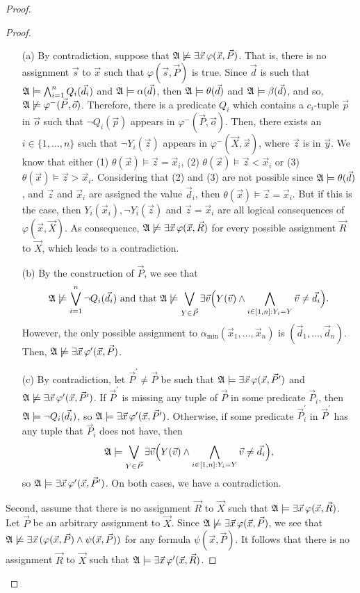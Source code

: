 \documentclass[12pt]{article}
\def\A{{\frak A}}
\def\P{\vec{P}}
\def\R{\vec{R}}
\def\X{\vec{X}}
\def\d{\vec{d}} %
\def\s{\vec{s}}
\def\v{\vec{v}} %
\def\x{\vec{x}} %
\def\y{\vec{y}} %
\def\z{\vec{z}} %
\def\ep{\vec{o}}
\def\ga{\vec{p}}
\begin{document}
\begin{proof}
\begin{enumerate}
\begin{proof}
\begin{enumerate}
\item[(a)] By contradiction, suppose that $\A\not\models\exists\x\,\varphi(\x,\P)$. That is, there is no assignment $\s$ to $\x$ such that $\varphi(\s,\P)$ is true. Since $\d$ is such that $\A\models \bigwedge_{i=1}^n Q_i(\d_i)$ and $\A\models \alpha(\d)$, then $\A\models\theta(\d)$ and $\A\models\beta(\d)$, and so, $\A\not\models\varphi^{-}(\P,\ep)$. Therefore, there is a predicate $Q_i$ which contains a $c_i$-tuple $\ga$ in $\ep$ such that $\neg Q_i(\ga)$ appears in $\varphi^{-}(\P,\ep)$. Then, there exists an $i\in\{1,\ldots,n\}$ such that $\neg Y_i(\z)$ appears in $\varphi^{-}(\X,\x)$, where $\z$ is in $\y$. We know that either (1) $\theta(\x)\models \z = \x_i$, (2) $\theta(\x)\models \z < \x_i$ or (3) $\theta(\x)\models \z > \x_i$. Considering that (2) and (3) are not possible since $\A\models\theta(\d)$, and $\z$ and $\x_i$ are assigned the value $\d_i$, then $\theta(\x)\models \z = \x_i$. But if this is the case, then $Y_i(\x_i), \neg Y_i(\z)$ and $\z = \x_i$ are all logical consequences of $\varphi(\x,\X).$ As consequence, $\A\not\models\exists\x\,\varphi(\x,\R)$ for every possible assignment $\R$ to $\X$, which leads to a contradiction.
\item[(b)] By the construction of $\P$, we see that 
$$\A\not\models\bigvee_{i = 1}^{n}\neg Q_i(\d_i) \text{ and that } \A\not\models\bigvee_{Y\in\P} \exists \v\Big( Y(\v) \wedge \bigwedge_{i\in[1,n]: Y_i = Y} \v \neq \d_i\Big).$$ However, the only possible assignment to $\alpha_{\min}(\x_1,\dots,\x_n)$ is $(\d_1,\dots,\d_n)$. Then, $\A\not\models\exists\x\,\varphi^\prime(\x,\P)$.
\item[(c)] By contradiction, let $\P^\prime \neq \P$ be such that $\A\models\exists\x\,\varphi(\x,\P^\prime)$ and $\A\not\models\exists\x\,\varphi^\prime(\x,\P^\prime)$. If $\P^\prime$ is missing any tuple of $\P$ in some predicate $\P_i$, then $\A\models \neg Q_i(\d_i)$, so $\A\models\exists\x\,\varphi^\prime(\x,\P^\prime)$. Otherwise, if some predicate $\P^\prime_i$ in $\P^\prime$ has any tuple that $\P_i$ does not have, then $$\A\models\bigvee_{Y\in\P} \exists \v\Big( Y(\v) \wedge \bigwedge_{i\in[1,n]: Y_i = Y} \v \neq \d_i\Big),$$ so $\A\models\exists\x\,\varphi^\prime(\x,\P^\prime)$. On both cases, we have a contradiction.
\end{enumerate}
Second, assume that there is no assignment $\R$ to $\X$ such that $\A\models\exists\x\,\varphi(\x,\R)$. Let $\P$ be an arbitrary assignment to $\X$. Since $\A\not\models\exists\x\,\varphi(\x,\P)$, we see that $\A\not\models\exists\x\,(\varphi(\x,\P)\wedge\psi(\x,\P))$ for any formula $\psi(\x,\P)$. It follows that there is no assignment $\R$ to $\X$ such that $\A\models\exists\x\,\varphi^\prime(\x,\R)$.
\end{proof}


\end{enumerate}
\end{proof}
\end{document}
